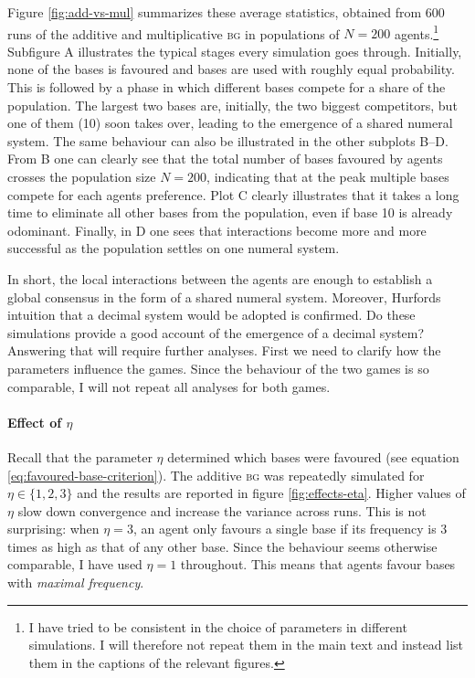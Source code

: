 \documentclass{../src/bcthesispart}
\begin{document}
Figure \ref{fig:add-vs-mul} summarizes these average statistics, obtained from 600 runs of the additive and multiplicative \textsc{bg} in populations of $N=200$ agents.\footnote{I have tried to be consistent in the choice of parameters in different simulations. I will therefore not repeat them in the main text and instead list them in the captions of the relevant figures.}
Subfigure A illustrates the typical stages every simulation goes through.
Initially, none of the bases is favoured and bases are used with roughly equal probability.
This is followed by a phase in which different bases compete for a share of the population.
The largest two bases are, initially, the two biggest competitors, but one of them (10) soon takes over, leading to the emergence of a shared numeral system.
The same behaviour can also be illustrated in the other subplots B--D. 
From B one can clearly see that the total number of bases favoured by agents crosses the population size $N=200$, indicating that at the peak multiple bases compete for each agents preference.
Plot C clearly illustrates that it takes a long time to eliminate all other bases from the population, even if base 10 is already odominant.
Finally, in D one sees that interactions become more and more successful as the population settles on one numeral system.


In short, the local interactions between the agents are enough to establish a global consensus in the form of a shared numeral system.
Moreover, Hurfords intuition that a decimal system would be adopted is confirmed.
Do these simulations provide a good account of the emergence of a decimal system? 
Answering that will require further analyses. 
First we need to clarify how the parameters influence the games.
Since the behaviour of the two games is so comparable, I will not repeat all analyses for both games.


\paragraph{Effect of $\eta$}
Recall that the parameter $\eta$ determined which bases were favoured (see equation \ref{eq:favoured-base-criterion}).
The additive \textsc{bg} was repeatedly simulated for $\eta \in \{1, 2, 3\}$ and the results are reported in figure \ref{fig:effects-eta}.
Higher values of $\eta$ slow down convergence and increase the variance across runs. 
This is not surprising: when $\eta=3$, an agent only favours a single base if its frequency is 3 times as high as that of any other base. 
Since the behaviour seems otherwise comparable, I have used $\eta=1$ throughout. This means that agents favour bases with \emph{maximal frequency}.
\end{document}
